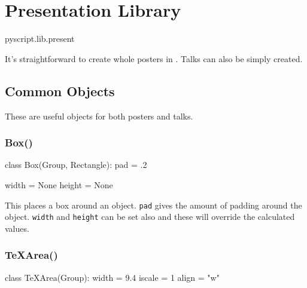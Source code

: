 % 
%
%


\chapter{Presentation Library}

\begin{python}
pyscript.lib.present
\end{python}

It's straightforward to create whole posters in \pyscript. 
Talks can also be simply created. 

\section{Common Objects}

These are useful objects for both posters and talks.

\subsection{Box()}
\begin{python}
class Box(Group, Rectangle):
    pad = .2

    width = None
    height = None
\end{python}

This places a box around an object. \Verb|pad| gives the amount of padding
around the object. \Verb|width| and \Verb|height| can be set also and these
will override the calculated values. 

\subsection{TeXArea()}
\begin{python}
class  TeXArea(Group):
    width = 9.4
    iscale = 1
    align = "w"
\end{python}
    
